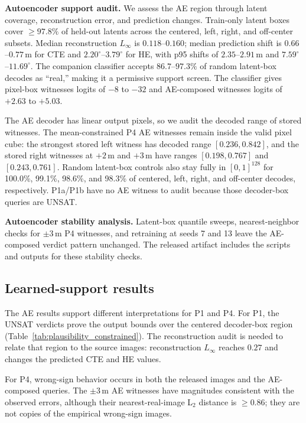 \documentclass[twocolumn,smallextended,runningheads]{svjour3}
\begin{document}
\textbf{Autoencoder support audit.} We assess the AE region through latent coverage, reconstruction error, and prediction changes. Train-only latent boxes cover $\ge 97.8\%$ of held-out latents across the centered, left, right, and off-center subsets. Median reconstruction $L_\infty$ is $0.118$--$0.160$; median prediction shift is $0.66$--$0.77$\,m for CTE and $2.20^\circ$--$3.79^\circ$ for HE, with p95 shifts of $2.35$--$2.91$\,m and $7.59^\circ$--$11.69^\circ$. The companion classifier accepts $86.7$--$97.3\%$ of random latent-box decodes as ``real,'' making it a permissive support screen. The classifier gives pixel-box witnesses logits of $-8$ to $-32$ and AE-composed witnesses logits of $+2.63$ to $+5.03$.

The AE decoder has linear output pixels, so we audit the decoded range of stored witnesses. The mean-constrained P4 AE witnesses remain inside the valid pixel cube: the strongest stored left witness has decoded range $[0.236,0.842]$, and the stored right witnesses at $+2$\,m and $+3$\,m have ranges $[0.198,0.767]$ and $[0.243,0.761]$. Random latent-box controls also stay fully in $[0,1]^{128}$ for 100.0\%, 99.1\%, 98.6\%, and 98.3\% of centered, left, right, and off-center decodes, respectively. P1a/P1b have no AE witness to audit because those decoder-box queries are UNSAT.

\textbf{Autoencoder stability analysis.} Latent-box quantile sweeps, nearest-neighbor checks for $\pm3$\,m P4 witnesses, and retraining at seeds 7 and 13 leave the AE-composed verdict pattern unchanged. The released artifact includes the scripts and outputs for these stability checks.

\subsection{Learned-support results}


The AE results support different interpretations for P1 and P4. For P1, the UNSAT verdicts prove the output bounds over the centered decoder-box region (Table~\ref{tab:plausibility_constrained}). The reconstruction audit is needed to relate that region to the source images: reconstruction $L_\infty$ reaches $0.27$ and changes the predicted CTE and HE values.

For P4, wrong-sign behavior occurs in both the released images and the AE-composed queries. The $\pm3$\,m AE witnesses have magnitudes consistent with the observed errors, although their nearest-real-image L$_2$ distance is $\geq 0.86$; they are not copies of the empirical wrong-sign images.
\end{document}
